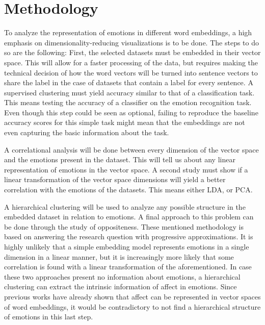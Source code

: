 \chapter{Methodology}\label{chap:Methodology}

To analyze the representation of emotions in different word embeddings, a high emphasis on dimensionality-reducing visualizations is to be done. The steps to do so are the following:
First, the selected datasets must be embedded in their vector space. This will allow for a faster processing of the data, but requires making the technical decision of how the word vectors will be turned into sentence vectors to share the label in the case of datasets that contain a label for every sentence.
A supervised clustering must yield accuracy similar to that of a classification task. This means testing the accuracy of a classifier on the emotion recognition task. Even though this step could be seen as optional, failing to reproduce the baseline accuracy scores for this simple task might mean that the embeddings are not even capturing the basic information about the task.

A correlational analysis will be done between every dimension of the vector space and the emotions present in the dataset. This will tell us about any linear representation of emotions in the vector space.
A second study must show if a linear transformation of the vector space dimensions will yield a better correlation with the emotions of the datasets. This means either LDA, or PCA\@.

A hierarchical clustering will be used to analyze any possible structure in the embedded dataset in relation to emotions.
A final approach to this problem can be done through the study of oppositeness.
These mentioned methodology is based on answering the research question with progressive approximations. It is highly unlikely that a simple embedding model represents emotions in a single dimension in a linear manner, but it is increasingly more likely that some correlation is found with a linear transformation of the aforementioned. In case these two approaches present no information about emotions, a hierarchical clustering can extract the intrinsic information of affect in emotions. Since previous works have already shown that affect can be represented in vector spaces of word embeddings, it would be contradictory to not find a hierarchical structure of emotions in this last step.
